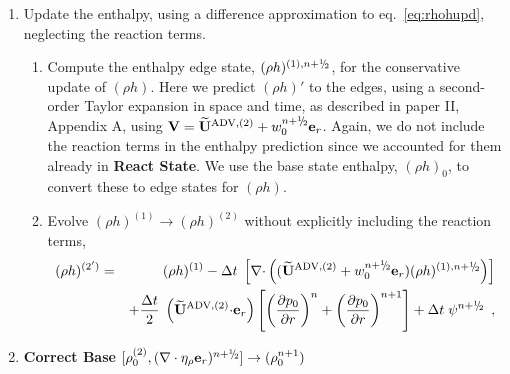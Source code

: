 \documentclass[11pt]{article}
\newcommand{\nablab}{\mathbf{\nabla}}
\newcommand{\cdotb}{\mathbf{\cdot}}
\newcommand{\sfrac}[2]{\mathchoice
  {\kern0em\raise.5ex\hbox{\the\scriptfont0 #1}\kern-.15em/
   \kern-.15em\lower.25ex\hbox{\the\scriptfont0 #2}}
  {\kern0em\raise.5ex\hbox{\the\scriptfont0 #1}\kern-.15em/
   \kern-.15em\lower.25ex\hbox{\the\scriptfont0 #2}}
  {\kern0em\raise.5ex\hbox{\the\scriptscriptfont0 #1}\kern-.2em/
   \kern-.15em\lower.25ex\hbox{\the\scriptscriptfont0 #2}}
  {#1\!/#2}}
\newcommand{\myhalf}{\sfrac{1}{2}}
\newcommand{\nph}{{n + \myhalf}}
\newcommand{\uadvtwo}{\widetilde{\mathbf{U}}^{\mathrm{ADV},(2)}}
\newcommand{\V}{\mathbf{V}}
\newcommand{\dt}{\Delta t}
\newcommand{\etarho}{\eta_{\rho}}
\newcommand{\er}{\mathbf{e}_r}
\begin{document}
\begin{description}
\begin{enumerate}
\item Update the enthalpy, using a difference approximation to
  eq.~\ref{eq:rhohupd}, neglecting the reaction terms.

  \begin{enumerate}
  \renewcommand{\labelenumii}{{\bf \roman{enumii}}.}

  \item Compute the enthalpy edge state, $(\rho h)^{(1),\nph}$, for
    the conservative update of $(\rho h)$. Here we predict $(\rho h)'$
    to the edges, using a second-order Taylor expansion in space and
    time, as described in paper II, Appendix A, using $\V =
    \uadvtwo+w_0^{\nph} \er$.  Again, we do not include the reaction
    terms in the enthalpy prediction since we accounted for them
    already in {\bf React State}. We use the base state enthalpy,
    $(\rho h)_0$, to convert these to edge states for $(\rho h)$.

   \item Evolve $(\rho h)^{(1)} \rightarrow (\rho h)^{(2)}$ without
     explicitly including the reaction terms,
\begin{eqnarray}
(\rho h)^{(2')} &=& (\rho h)^{(1)} - \dt \; \left[ \nablab \cdotb \left( (\uadvtwo+w_0^{\nph} \er)  
(\rho h)^{(1),\nph} \right) \right] \nonumber \\
&& + \frac{\dt}{2} \; \left(\uadvtwo \cdotb \er\right)
\left [ \left(\frac{\partial p_0}{\partial r} \right)^{n}
      + \left(\frac{\partial p_0}{\partial r} \right)^{n+1}  \right ] 
+ \dt \; \psi^{\nph} \enskip ,
\end{eqnarray}

\end{enumerate}

\item {\bf Correct Base}
$[\rho_0^{(2)}, (\nabla\cdot\etarho\er)^{\nph}] \rightarrow (\rho_0^{n+1})$


\end{enumerate}
\end{description}
\end{document}
